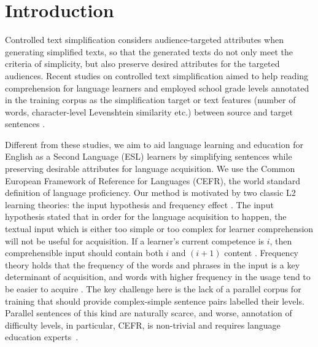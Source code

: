 \section{Introduction}
Controlled text simplification considers audience-targeted attributes when generating simplified texts, so that the generated texts do not only meet the criteria of simplicity, but also preserve desired attributes for the targeted audiences. 
Recent studies on controlled text simplification aimed to help reading comprehension for language learners and employed school grade levels annotated in the training corpus as the simplification target \cite{scarton-specia-2018-learning, sheang-saggion-2021-controllable,agrawal-carpuat-2023-controlling} or text features (number of words, character-level Levenshtein similarity etc.) between source and target sentences \cite{nishihara-etal-2019-controllable, martin-etal-2020-controllable}. 

Different from these studies, we aim to aid language learning and education for English as a Second Language (ESL) learners by simplifying sentences while preserving desirable attributes for language acquisition. 
We use the Common European Framework of Reference for Languages (CEFR), the world standard definition of language proficiency. 
Our method is motivated by two classic L2 learning theories: the input hypothesis \cite{krashen1981second} and frequency effect \cite{ellis2002frequency}. 
The input hypothesis stated that in order for the language acquisition to happen, the textual input which is either too simple or too complex for learner comprehension will not be useful for acquisition. If a learner’s current competence is $i$, then comprehensible input should contain both $i$ and $(i + 1)$ content \cite{mitchell2019second}. Frequency theory holds that the frequency of the words and phrases in the input is a key determinant of acquisition, and words with higher frequency in the usage tend to be easier to acquire \cite{ellis2009construction}. 
The key challenge here is the lack of a parallel corpus for training that should provide complex-simple sentence pairs labelled their levels. 
Parallel sentences of this kind are naturally scarce, and worse, annotation of difficulty levels, in particular, CEFR, is non-trivial and requires language education experts~\cite{arase-etal-2022-cefr}.  


